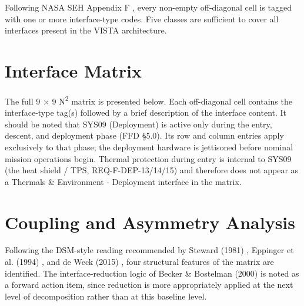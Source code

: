 Following NASA SEH Appendix F \cite{nasaappf}, every non-empty off-diagonal cell is tagged with one or more interface-type codes. Five classes are sufficient to cover all interfaces present in the VISTA architecture.

\section{Interface Matrix}

The full 9 $\times$ 9 N\textsuperscript{2} matrix is presented below. Each off-diagonal cell contains the interface-type tag(s) followed by a brief description of the interface content. It should be noted that SYS09 (Deployment) is active only during the entry, descent, and deployment phase (FFD §5.0). Its row and column entries apply exclusively to that phase; the deployment hardware is jettisoned before nominal mission operations begin. Thermal protection during entry is internal to SYS09 (the heat shield / TPS, REQ-F-DEP-13/14/15) and therefore does not appear as a Thermals \& Environment - Deployment interface in the matrix.

\section{Coupling and Asymmetry Analysis}

Following the DSM-style reading recommended by Steward (1981) \cite{steward1981}, Eppinger et al. (1994) \cite{eppinger1994}, and de Weck (2015) \cite{deweck2015}, four structural features of the matrix are identified. The interface-reduction logic of Becker \& Bostelman (2000) \cite{becker2000} is noted as a forward action item, since reduction is more appropriately applied at the next level of decomposition rather than at this baseline level.


